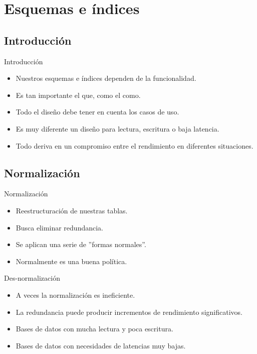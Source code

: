 \section{Esquemas e índices}

\subsection{Introducción}
\begin{frame}{Introducción}
  \begin{itemize}
    \item Nuestros esquemas e índices dependen de la funcionalidad.
    \item Es tan importante el que, como el como.
    \item Todo el diseño debe tener en cuenta los casos de uso.
    \item Es muy diferente un diseño para lectura, escritura o baja latencia.
    \item Todo deriva en un compromiso entre el rendimiento en diferentes situaciones.
  \end{itemize}
\end{frame}

\subsection{Normalización}
\begin{frame}{Normalización}
  \begin{itemize}
    \item Reestructuración de nuestras tablas.
    \item Busca eliminar redundancia.
    \item Se aplican una serie de ''formas normales''.
    \item Normalmente es una buena política.
  \end{itemize}
\end{frame}

\begin{frame}{Des-normalización}
  \begin{itemize}
    \item A veces la normalización es ineficiente.
    \item La redundancia puede producir incrementos de rendimiento significativos.
    \item Bases de datos con mucha lectura y poca escritura.
    \item Bases de datos con necesidades de latencias muy bajas.
  \end{itemize}
\end{frame}

